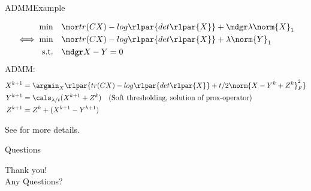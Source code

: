 \begin{frame}{ADMM}{Example \cite{admm_slides}}
    \begin{examp}[]
    \begin{align*}
        \min \quad & {\mor tr(CX) - log\rlpar{det\rlpar{X}}} + {\mdgr \lambda \norm{X}_1} \\
        \iff
        \min \quad & {\mor tr(CX) - log\rlpar{det\rlpar{X}} + \lambda \norm{Y}_1} \\
        \text{s.t.} \quad & {\mdgr X - Y = 0}
    \end{align*}
    ADMM:
    \begin{align*}
        X^{k+1} &= \argmin_X \rlpar{tr(CX)-log\rlpar{det\rlpar{X}} + t/2 \norm{X-Y^k + Z^k}_F^2} \\
        Y^{k+1} &= \cals_{\lambda/t} (X^{k+1} + Z^k)  \quad \text{(Soft thresholding, solution of prox-operator)}\\
        Z^{k+1} &= Z^k + (X^{k+1} - Y^{k+1})
    \end{align*}
    \end{examp}
    See \cite{admm_slides} for more details.
\end{frame}{}









\begin{frame}{Questions}
    \begin{center}
        Thank you! \\
        Any Questions?   
    \end{center}{}
\end{frame}{}
























